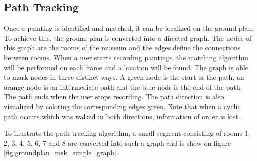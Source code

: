 \documentclass[10pt,final,journal]{IEEEtran}
\begin{document}
	\subsection{Path Tracking}
	Once a painting is identified and matched, it can be localized on the ground plan. To achieve this, the ground plan is converted into a directed graph. The nodes of this graph are the rooms of the museum and the edges define the connections between rooms. When a user starts recording paintings, the matching algorithm will be performed on each frame and a location will be found. The graph is able to mark nodes in three distinct ways. A green node is the start of the path, an orange node is an intermediate path and the blue node is the end of the path. The path ends when the user stops recording. The path direction is also visualized by coloring the corresponding edges green. Note that when a cyclic path occurs which was walked in both directions, information of order is lost.
	
	
	
	
	To illustrate the path tracking algorithm,  a small segment consisting of rooms 1, 2, 3, 4, 5, 6, 7 and 8 are converted into such a graph and is show on figure \ref{fig:groundplan_msk_simple_graph}.
	
	
\end{document}
